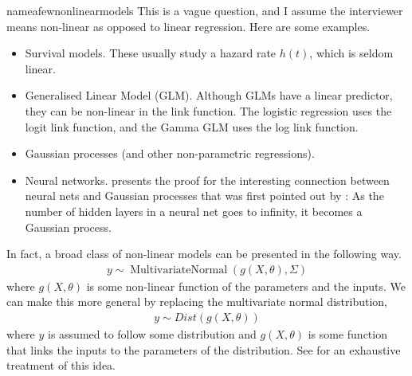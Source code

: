 \begin{answer}{nameafewnonlinearmodels}
  This is a vague question, and I assume the interviewer means non-linear as opposed to linear regression.
Here are some examples.
\begin{itemize}
  \item Survival models. These usually study a hazard rate $h(t)$, which is seldom linear.
  \item Generalised Linear Model (GLM). Although GLMs have a linear predictor, they can be non-linear in the link function.
  The logistic regression uses the logit link function, and the Gamma GLM uses the log link function.
  \item Gaussian processes (and other non-parametric regressions).
  \item Neural networks. \citet[chap.~15.4]{murphy2012machine} presents the proof for the interesting connection between neural nets and Gaussian processes that was first pointed out by  \citet{neal1996bayesian}: As the number of hidden layers in a neural net goes to infinity, it becomes a Gaussian process.
\end{itemize}
In fact, a broad class of non-linear models can be presented in the following way.
\begin{align*}
  y \sim
  \operatorname{MultivariateNormal}( g(X,\theta), \Sigma )
\end{align*}
where $g(X,\theta)$ is some non-linear function of the parameters and the inputs.
We can make this more general by replacing the multivariate normal distribution,
\begin{align*}
  y \sim Dist( g(X,\theta) )
\end{align*}
where $y$ is assumed to follow some distribution and $g(X, \theta)$ is some function that links the inputs to the parameters of the distribution.
See \citet{murphy2012machine} for an exhaustive treatment of this idea.

\end{answer}
